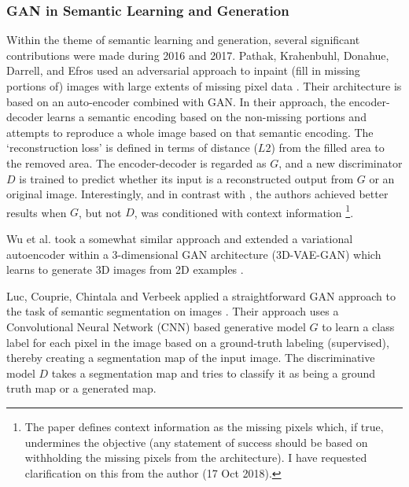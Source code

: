 \documentclass[11pt]{article}
\begin{document}
\subsubsection{GAN in Semantic Learning and Generation}
Within the theme of semantic learning and generation, several significant contributions were made during 2016 and 2017.  Pathak, Krahenbuhl, Donahue, Darrell, and Efros used an adversarial approach to inpaint (fill in missing portions of) images with large extents of missing pixel data \cite{pathakCVPR16context}.  Their architecture is based on an auto-encoder \cite{hinton2006reducing} combined with GAN.  In their approach, the encoder-decoder learns a semantic encoding based on the non-missing portions and attempts to reproduce a whole image based on that semantic encoding.  The `reconstruction loss' is defined in terms of distance ($L2$) from the filled area to the removed area. The encoder-decoder is regarded as $G$, and a new discriminator $D$ is trained to predict whether its input is a reconstructed output from $G$ or an original image.  Interestingly, and in contrast with \cite{mirza2014conditional}, the authors achieved better results when $G$, but not $D$, was conditioned with context information \footnote{The paper defines context information as the missing pixels which, if true, undermines the objective (any statement of success should be based on withholding the missing pixels from the architecture).  I have requested clarification on this from the author (17 Oct 2018).}.

Wu et al. took a somewhat similar approach and extended a variational autoencoder \cite{larsen2015autoencoding} within a 3-dimensional GAN architecture (3D-VAE-GAN) which learns to generate 3D images from 2D examples \cite{NIPS2016_6096}.

Luc, Couprie, Chintala and Verbeek applied a straightforward GAN approach to the task of semantic segmentation on images \cite{Luc2016SemanticSU}.  Their approach uses a Convolutional Neural Network (CNN) based generative model $G$ to learn a class label for each pixel in the image based on a ground-truth labeling (supervised), thereby creating a segmentation map of the input image.  The discriminative model $D$ takes a segmentation map and tries to classify it as being a ground truth map or a generated map.  
\end{document}
